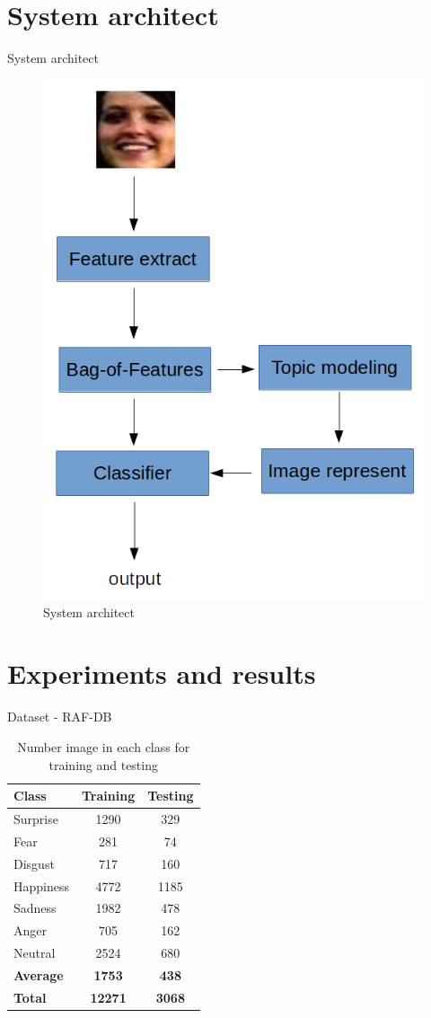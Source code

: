 \documentclass{beamer}
\begin{document}
\section{System architect}
\begin{frame}{System architect}
    \begin{figure}
        \centering
        \includegraphics[width=.45\textwidth]{system-arch-cropped.png}
        \caption{System architect}
        \label{fig:system-architect}
    \end{figure}
\end{frame}

\section{Experiments and results}
\begin{frame}{Dataset - RAF-DB}
    \begin{table}[h!]
\centering
\caption{Number image in each class for training and testing} \label{tbl:raf-db-count}
\begin{tabular}{|l|c|c|}
\hline
\textbf{Class} & \textbf{Training} & \textbf{Testing} \\ \hline
Surprise & 1290 & 329 \\ \hline
Fear & 281 & 74 \\ \hline
Disgust & 717 & 160 \\ \hline
Happiness & 4772 & 1185 \\ \hline
Sadness & 1982 & 478 \\ \hline
Anger & 705 & 162 \\ \hline
Neutral & 2524 & 680 \\ \hline \hline
\textbf{Average} & \textbf{1753} & \textbf{438} \\ \hline
\textbf{Total} & \textbf{12271} & \textbf{3068} \\ \hline
\end{tabular}
\end{table}
\end{frame}
\end{document}
